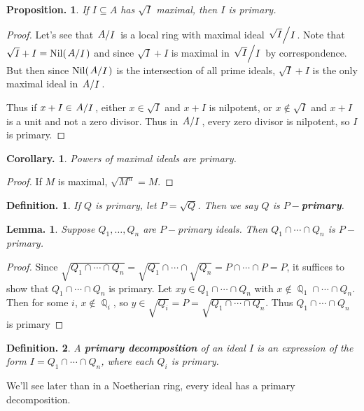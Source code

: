 \documentclass[11pt, a4paper]{memoir}
\DeclareMathOperator{\Q}{{\mathbb{Q}}}
\newcommand{\mbf}[1]{{\boldmath\bfseries #1}}
\theoremstyle{change}
\newtheorem{lemma}[theorem]{Lemma.}
\newtheorem{corollary}[theorem]{Corollary.}
\newtheorem{proposition}[theorem]{Proposition.}
\theoremstyle{plain}
\theoremstyle{nonumberplain}
\newtheorem{definition}{Definition.}
\newtheorem{proof}{Proof}
\DeclareMathOperator{\Nil}{Nil}
\newcommand{\quot}[2]{\mathchoice{\left.\raisebox{0.10em}{$#1$}\middle/\raisebox{-0.10em}{$#2$}\right.}
                                 {\left.\raisebox{0.04em}{$#1$}\middle/\raisebox{-0.04em}{$#2$}\right.}
                                 {\left.\raisebox{0.01em}{$#1$}\middle/\raisebox{-0.01em}{$#2$}\right.}
                                 {\left.\raisebox{0em}{$#1$}\middle/\raisebox{0em}{$#2$}\right.}}
\numberwithin{equation}{section}
\begin{document}
\begin{proposition}
    If $I\subseteq A$ has $\sqrt{I}$ maximal, then $I$ is primary.
\end{proposition}
\begin{proof}
    Let's see that $\quot{A}{I}$ is a local ring with maximal ideal $\quot{\sqrt{I}}{I}$.
    Note that $\sqrt{I}+I=\Nil(\quot{A}{I})$ and since $\sqrt{I}+I$ is maximal in $\quot{\sqrt{I}}{I}$ by correspondence.
    But then since $\Nil(\quot{A}{I})$ is the intersection of all prime ideals, $\sqrt{I}+I$ is the only maximal ideal in $\quot{A}{I}$.

    Thus if $x+I\in\quot{A}{I}$, either $x\in\sqrt{I}$ and $x+I$ is nilpotent, or $x\notin\sqrt{I}$ and $x+I$ is a unit and not a zero divisor.
    Thus in $\quot{A}{I}$, every zero divisor is nilpotent, so $I$ is primary.
\end{proof}
\begin{corollary}
    Powers of maximal ideals are primary.
\end{corollary}
\begin{proof}
    If $M$ is maximal, $\sqrt{M^n}=M$.
\end{proof}
\begin{definition}
    If $Q$ is primary, let $P=\sqrt{Q}$.
    Then we say $Q$ is \mbf{$P-$primary}.
\end{definition}
\begin{lemma}\label{lem:int-prim}
    Suppose $Q_1,\ldots,Q_n$ are $P-$primary ideals.
    Then $Q_1\cap\cdots\cap Q_n$ is $P-$primary.
\end{lemma}
\begin{proof}
    Since $\sqrt{Q_1\cap\cdots\cap Q_n}=\sqrt{Q_1}\cap\cdots\cap\sqrt{Q_n}=P\cap\cdots \cap P=P$, it suffices to show that $Q_1\cap\cdots\cap Q_n$ is primary.
    Let $xy\in Q_1\cap\cdots\cap Q_n$ with $x\notin\Q_1\cap\cdots\cap Q_n$.
    Then for some $i$, $x\notin\Q_i$, so $y\in\sqrt{Q_i}=P=\sqrt{Q_1\cap\cdots\cap Q_n}$.
    Thus $Q_1\cap\cdots\cap Q_n$ is primary
\end{proof}
\begin{definition}
    A \textbf{primary decomposition} of an ideal $I$ is an expression of the form $I=Q_1\cap\cdots\cap Q_n$, where each $Q_i$ is primary.
\end{definition}
We'll see later than in a Noetherian ring, every ideal has a primary decomposition.
\end{document}
